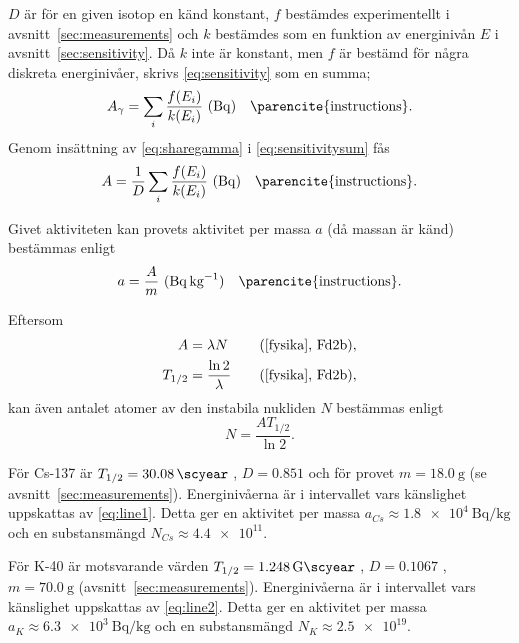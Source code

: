 $D$ är för en given isotop en känd konstant, $f$ bestämdes experimentellt
i avsnitt~\ref{sec:measurements} och $k$ bestämdes som en funktion av
energinivån $E$ i avsnitt~\ref{sec:sensitivity}. Då $k$ inte är konstant, men
$f$ är bestämd för några diskreta energinivåer, skrivs \eqref{eq:sensitivity}
som en summa;
%
\begin{equation}
    A_\gamma = \sum_i \frac{f(E_i)}{k(E_i)} \inlineunit{\becquerel} \quad \text{\parencite{instructions}} \label{eq:sensitivitysum}.
\end{equation}
%
Genom insättning av \eqref{eq:sharegamma} i \eqref{eq:sensitivitysum} fås
%
\begin{equation}
    A = \frac{1}{D} \sum_i \frac{f(E_i)}{k(E_i)} \inlineunit{\becquerel} \quad \text{\parencite{instructions}} \label{eq:activitysum}.
\end{equation}

Givet aktiviteten kan provets aktivitet per massa $a$ (då massan är känd)
bestämmas enligt
%
\begin{equation}
    a = \frac{A}{m} \inlineunit{\becquerel\per\kg} \quad \text{\parencite{instructions}} \label{eq:apm}.
\end{equation}

Eftersom
%
\begin{align}
    A       &= \lambda N             &\quad \fysika{Fd2b} \label{eq:activity}, \\
    T_{1/2} &= \frac{\ln 2}{\lambda} &\quad \fysika{Fd2b} \label{eq:halflife},
\end{align}
%
kan även antalet atomer av den instabila nukliden $N$ bestämmas enligt
%
\begin{equation}
    N = \frac{A T_{1/2}}{\ln 2} \label{eq:substance}.
\end{equation}

För Cs-137 är $T_{1/2} = \qty{30.08}{\scyear}$ ,
$D = \num{0.851}$ \parencite{instructions} och för provet $m = \qty{18.0}{\g}$
(se avsnitt~\ref{sec:measurements}). Energinivåerna är i intervallet vars
känslighet uppskattas av \eqref{eq:line1}. Detta ger en aktivitet per massa
$a_{Cs} \approx \qty{1.8e4}{\becquerel\per\kg}$ och en substansmängd
$N_{Cs} \approx \num{4.4e11}$.

För K-40 är motsvarande värden $T_{1/2} = \qty{1.248}{\giga\scyear}$
, $D = \num{0.1067}$ \parencite{instructions}, $m = \qty{70.0}{\g}$
(avsnitt~\ref{sec:measurements}). Energinivåerna är i intervallet vars
känslighet uppskattas av \eqref{eq:line2}. Detta ger en aktivitet per massa
$a_K \approx \qty{6.3e3}{\becquerel\per\kg}$ och en substansmängd
$N_K \approx \num{2.5e19}$.

